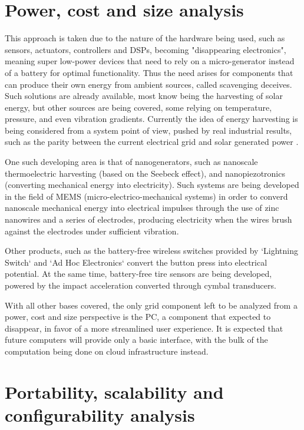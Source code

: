\section{Power, cost and size analysis}

This approach is taken due to the nature of the hardware being used, such as sensors, actuators, controllers and DSPs, becoming 
"disappearing electronics", meaning super low-power devices that need to rely on a micro-generator instead of a battery for optimal
functionality. Thus the need arises for components that can produce their own energy from ambient sources, called scavenging deceives.
Such solutions are already available, most know being the harvesting of solar energy, but other sources are being covered, some relying 
on temperature, pressure, and even vibration gradients. Currently the idea of energy harvesting is being considered from a system point
of view, pushed by real industrial results, such as the parity between the current electrical grid and solar generated power 
 \cite{36, 70, 71, 94}.

One such developing area is that of nanogenerators, such as nanoscale thermoelectric harvesting (based on the Seebeck effect), and
nanopiezotronics (converting mechanical energy into electricity). Such systems are being developed in the field of MEMS 
(micro-electrico-mechanical systems) in order to converd nanoscale mechanical energy into electrical impulses through the use of
zinc nanowires and a series of electrodes, producing electricity when the wires brush against the electrodes under sufficient vibration.
\cite{23, 71}

Other products, such as the battery-free wireless switches provided by `Lightning Switch` and `Ad Hoc Electronics` convert the button press
into electrical potential. At the same time, battery-free tire sensors are being developed, powered by the impact acceleration converted
through cymbal transducers. \cite{36}

With all other bases covered, the only grid component left to be analyzed from a power, cost and size perspective is the PC, a component
that expected to disappear, in favor of a more streamlined user experience. It is expected that future computers will provide only a basic
interface, with the bulk of the computation being done on cloud infrastructure instead. \cite{13}

\section{Portability, scalability and configurability analysis}

